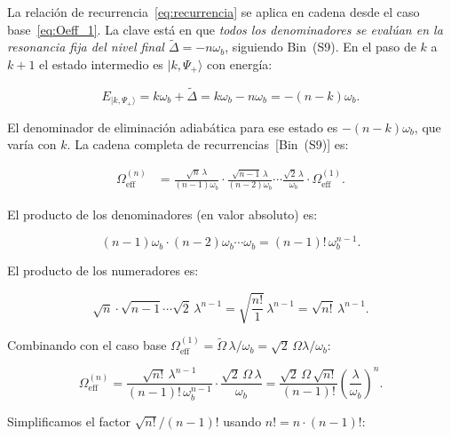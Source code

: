 \documentclass[12pt]{article}
\begin{document}
	La relaci\'on de recurrencia~\eqref{eq:recurrencia} se aplica en cadena
	desde el caso base~\eqref{eq:Oeff_1}. La clave est\'a en que \emph{todos
		los denominadores se eval\'uan en la resonancia fija del nivel final
		$\widetilde\Delta = -n\omega_b$}, siguiendo Bin~(S9). En el paso de $k$ a
	$k+1$ el estado intermedio es $|k, \Psi_+\rangle$ con energ\'ia:
	
	\begin{equation}
		E_{|k,\Psi_+\rangle} = k\omega_b + \widetilde\Delta
		= k\omega_b - n\omega_b = -(n-k)\omega_b.
	\end{equation}
	
	\noindent
	El denominador de eliminaci\'on adiab\'atica para ese estado es
	$-(n-k)\omega_b$, que var\'ia con $k$. La cadena completa de
	recurrencias~[Bin~(S9)] es:
	
	\begin{align}
		\Omega_\mathrm{eff}^{(n)}
		&= \frac{\sqrt{n}\,\lambda}{(n-1)\omega_b}\cdot
		\frac{\sqrt{n-1}\,\lambda}{(n-2)\omega_b}\cdots
		\frac{\sqrt{2}\,\lambda}{\omega_b}\cdot
		\Omega_\mathrm{eff}^{(1)}.
		\label{eq:cadena}
	\end{align}
	
	\noindent
	El producto de los denominadores (en valor absoluto) es:
	
	\begin{equation}
		(n-1)\omega_b \cdot (n-2)\omega_b \cdots \omega_b
		= (n-1)!\,\omega_b^{n-1}.
	\end{equation}
	
	\noindent
	El producto de los numeradores es:
	
	\begin{equation}
		\sqrt{n}\cdot\sqrt{n-1}\cdots\sqrt{2}\,\lambda^{n-1}
		= \sqrt{\frac{n!}{1}}\,\lambda^{n-1}
		= \sqrt{n!}\,\lambda^{n-1}.
	\end{equation}
	
	\noindent
	Combinando con el caso base $\Omega_\mathrm{eff}^{(1)} =
	\widetilde\Omega\,\lambda/\omega_b = \sqrt{2}\,\Omega\lambda/\omega_b$:
	
	\begin{equation}
		\Omega_\mathrm{eff}^{(n)}
		= \frac{\sqrt{n!}\,\lambda^{n-1}}{(n-1)!\,\omega_b^{n-1}}\cdot
		\frac{\sqrt{2}\,\Omega\,\lambda}{\omega_b}
		= \frac{\sqrt{2}\,\Omega\,\sqrt{n!}}{(n-1)!}
		\left(\frac{\lambda}{\omega_b}\right)^n.
		\label{eq:antes_simplificar}
	\end{equation}
	
	\noindent
	Simplificamos el factor $\sqrt{n!}/(n-1)!$ usando
	$n! = n\cdot(n-1)!$:
	
\end{document}
